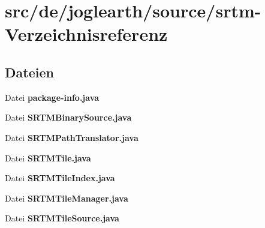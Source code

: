 \section{src/de/joglearth/source/srtm-\/\-Verzeichnisreferenz}
\label{dir_ea5921cb85ad32833fa84e084c213908}
\subsection*{Dateien}
\begin{DoxyCompactItemize}
\item 
Datei {\bfseries package-\/info.\-java}
\item 
Datei {\bfseries S\-R\-T\-M\-Binary\-Source.\-java}
\item 
Datei {\bfseries S\-R\-T\-M\-Path\-Translator.\-java}
\item 
Datei {\bfseries S\-R\-T\-M\-Tile.\-java}
\item 
Datei {\bfseries S\-R\-T\-M\-Tile\-Index.\-java}
\item 
Datei {\bfseries S\-R\-T\-M\-Tile\-Manager.\-java}
\item 
Datei {\bfseries S\-R\-T\-M\-Tile\-Source.\-java}
\end{DoxyCompactItemize}
